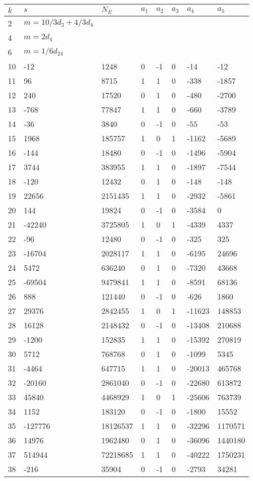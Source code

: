 \documentclass{amsart}
\begin{document}
\begin{longtable}{|l|l|l|lllll|}
\hline
$k$ & $s$ & $N_E$ & $a_1$ & $a_2$ & $a_3$ & $a_4$ & $a_5$\\
\hline
2&$m=10/3d_{3}+4/3d_{4}$&&\multicolumn{5}{c|}{}\\
4&$m=2d_{4}$&&\multicolumn{5}{c|}{}\\
6&$m=1/6d_{24}$&&\multicolumn{5}{c|}{}\\
10&-12&1248&0&-1&0&-14&-12\\
11&96&8715&1&1&0&-338&-1857\\
12&240&17520&0&1&0&-480&-2700\\
13&-768&77847&1&1&0&-660&-3789\\
14&-36&3840&0&-1&0&-55&-53\\
15&1968&185757&1&0&1&-1162&-5689\\
16&-144&18480&0&-1&0&-1496&-5904\\
17&3744&383955&1&1&0&-1897&-7544\\
18&-120&12432&0&1&0&-148&-148\\
19&22656&2151435&1&1&0&-2932&-5861\\
20&144&19824&0&-1&0&-3584&0\\
21&-42240&3725805&1&0&1&-4339&4337\\
22&-96&12480&0&-1&0&-325&325\\
23&-16704&2028117&1&1&0&-6195&24696\\
24&5472&636240&0&1&0&-7320&43668\\
25&-69504&9479841&1&1&0&-8591&68136\\
26&888&121440&0&-1&0&-626&1860\\
27&29376&2842455&1&0&1&-11623&148853\\
28&16128&2148432&0&-1&0&-13408&210688\\
29&-1200&152835&1&1&0&-15392&270819\\
30&5712&768768&0&1&0&-1099&5345\\
31&-4464&647715&1&1&0&-20013&465768\\
32&-20160&2861040&0&-1&0&-22680&613872\\
33&45840&4468929&1&0&1&-25606&763739\\
34&1152&183120&0&-1&0&-1800&15552\\
35&-127776&18126537&1&1&0&-32296&1170571\\
36&14976&1962480&0&1&0&-36096&1440180\\
37&514944&72218685&1&1&0&-40222&1750231\\
38&-216&35904&0&-1&0&-2793&34281\\

\end{longtable}
\end{document}
